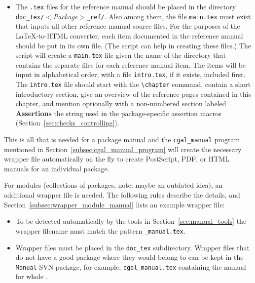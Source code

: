 \begin{itemize}
   \item The {\tt .tex} files for the reference manual should be placed in the
         directory \verb|doc_tex/|$<${\em Package}$>$\verb|_ref/|.
         Also among them, the file {\tt main.tex} must exist that
         inputs all other reference manual source files.
         For the purposes of the \LaTeX -to-HTML converter, each item
         documented in the reference manual should be put in its own file.
         (The script  can help
          in creating these files.)
         The script 
         will create a {\tt main.tex}%
         file given the name of the directory that contains the separate files
         for each
         reference manual item.  The items will be input in alphabetical order,
         with a file {\tt intro.tex}, if it
         exists, included first.  The {\tt intro.tex} file should
         start with the \verb|\chapter| command,
         contain a short introductory section, give an overview of the
         reference pages contained in this chapter, and mention
         optionally with a non-numbered section labeled \textbf{Assertions}
         the string used in the package-specific assertion macros
         (Section~\ref{sec:checks_controlling}).
\end{itemize}

This is all that is needed for a package manual and the
\texttt{cgal\_manual} program mentioned in
Section~\ref{subsec:cgal_manual_program} will create the necessary
wrapper file automatically on the fly to create PostScript, PDF, or
HTML manuals for an individual package.

For modules (collections of packages, note: maybe an outdated idea),
an additional wrapper file is needed.
The following rules describe the details, and
Section~\ref{subsec:wrapper_module_manual} lists an example wrapper file:

\begin{itemize}
   \item To be detected automatically by the tools in
         Section~\ref{sec:manual_tools} the wrapper filename must
         match the pattern {\tt *\_manual.tex}.
   \item Wrapper files must be placed in the \texttt{doc\_tex}
         subdirectory. Wrapper files that do not have a good package
         where they would belong to can be kept in the \texttt{Manual}
         SVN package, for example, \texttt{cgal\_manual.tex}
         containing the manual for whole \cgal.
\end{itemize}

